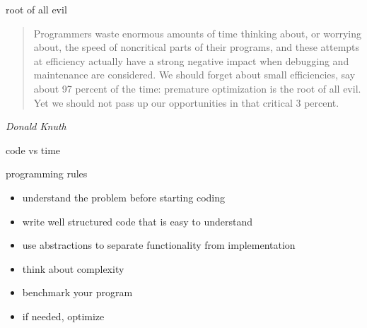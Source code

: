 \begin{frame}{root of all evil}

\begin{quote}
Programmers waste enormous amounts of time thinking about, or
worrying about, the speed of noncritical parts of their programs, and
these attempts at efficiency actually have a strong negative impact
when debugging and maintenance are considered. We should forget about
small efficiencies, say about 97 percent of the time: premature
optimization is the root of all evil. Yet we should not pass up our
opportunities in that critical 3 percent.
\end{quote}

 {\em Donald Knuth}


\end {frame}

\begin{frame}{code vs time}

\end{frame}

\begin{frame}{programming rules}

\begin{itemize}
\pause
\item understand the problem before starting coding
\pause
\item write well structured code that is easy to understand
\pause
\item use abstractions to separate functionality from implementation
\pause
\item think about complexity
\pause
\item benchmark your program 
\pause
\item if needed, optimize
\end{itemize}

\end{frame}





